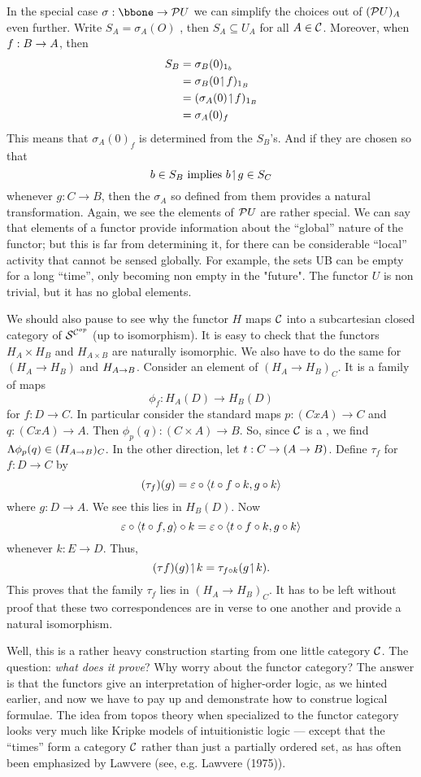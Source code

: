 In the special case $\sigma :\bbone \to \PU$ we can simplify the choices
out of $(\mathcal P U)_A$ even further. Write $S_A= \sigma_A(O)$ , then $S_A\subseteq U_A$ for all $A \in \mathcal C$. Moreover, when $f: B \rightarrow A$, then
\begin{align*}
S_B &= \sigma_B(0)_{{\textrm 1}_b}\\
&= \sigma_B(0 \!\upharpoonleft\! f)_{{\textrm 1} _B}\\
&= (\sigma_A(0) \!\upharpoonleft\! f)_{{\textrm 1} _B}\\
&= \sigma_A(0)_f
\end{align*}
This means that $\sigma_A(0)_f$ is determined from the $S_B$'s. And if they are chosen so that
$$
b \in S_B {\textrm{ implies }} b \!\upharpoonleft\! g \in S_C
$$
whenever $g: C\to B$, then the $\sigma_A$ so defined from them provides a
natural transformation. Again, we see the elements of $\mathcal P U$ are rather special. We can say that elements of a functor provide
information about the ``global'' nature of the functor; but this is far from determining it, for there can be considerable ``lo­cal'' activity that cannot be sensed globally. For example, the sets UB can be empty for a long ``time'', only becoming non­ empty in the "future". The functor $U$ is non trivial, but it has no global elements.

We should also pause to see why the functor $H$ maps $\mathcal C$ into a 
subcartesian closed category of $\mathcal S^{\mathcal C^{op}}$ (up to isomorphism). It
is easy to check that the functors $H_A \times H_B$ and $H_{A \times B}$ are naturally isomorphic. We also have to do the same for $(H_A \to H_B)$ and $H_{A \rightarrow B}$. Consider an element of $(H_A\to H_B)_C$. It is a family of maps
$$
\phi_f : H_A(D) \to H_B(D)
$$
for $f: D\to C$. In particular consider the standard maps
$p:	(C x A) \to C$ and $q : (C x A)\to A$. 
Then $\phi_p(q) : (C \times A)\to B$.
So, since $\mathcal C$ is a \ccc, we find $\Lambda\phi_p(q) \in (H_{A \rightarrow B})_C$. In the
other direction, let $t : C\rightarrow (A \rightarrow B)$.
Define $\tau_f$ for $f : D\to C$ by
$$
(\tau_f)(g) = \varepsilon \circ \langle t \circ f \circ k, g \circ k \rangle
$$
where $g : D \to A$. We see this lies in $H_B(D)$. Now
$$
\varepsilon \circ \langle t \circ f, g\rangle \circ k = \varepsilon \circ \langle t \circ f \circ k, g \circ k\rangle
$$
whenever $k: E \to D$. Thus,
$$
(\tau f)(g) \!\upharpoonleft\! k = \tau_{f \circ k}(g \!\upharpoonleft\! k).
$$
This proves that the family $\tau_f$ lies in $(H_A \to H_B)_C$. It has to be left without proof that these two correspondences are in­ verse to one another and provide a natural isomorphism.

Well, this is a rather heavy construction starting from one little category $\mathcal C$. The question: {\it what does it prove}? Why worry about the functor category? The answer is that the func­tors give an interpretation of higher-order logic, as we hinted earlier, and now we have to pay up and demonstrate
how to con­strue logical formulae. The idea from topos theory when spe­cialized to the functor category looks very much like Kripke models of intuitionistic logic --- except that the ``times'' form a category $\mathcal C$ rather than just a partially ordered set, as has often been emphasized by Lawvere (see, e.g. Lawvere (1975)).

